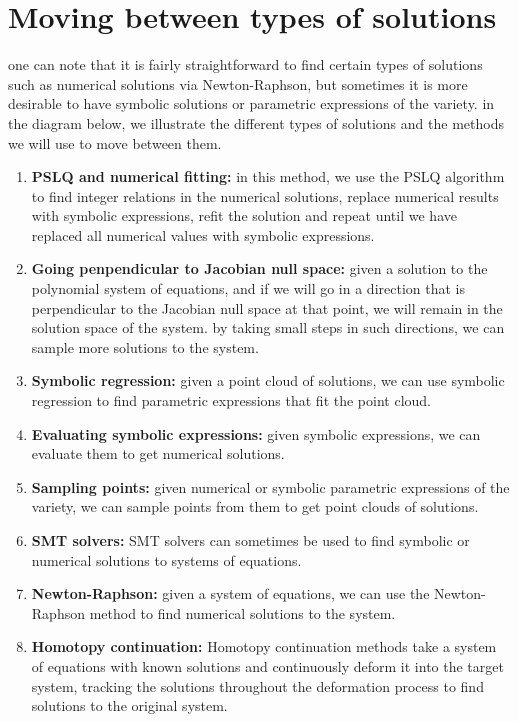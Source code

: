 \section*{Moving between types of solutions}
one can note that it is fairly straightforward to find certain types of solutions such as numerical solutions via Newton-Raphson, but sometimes it is more desirable to have symbolic solutions or parametric expressions of the variety. in the diagram below, we illustrate the different types of solutions and the methods we will use to move between them.



\begin{enumerate}
    \item \textbf{PSLQ and numerical fitting:} in this method, we use the PSLQ algorithm to find integer relations in the numerical solutions, replace numerical results with symbolic expressions, refit the solution and repeat until we have replaced all numerical values with symbolic expressions.
    \item \textbf{Going penpendicular to Jacobian null space:} given a solution to the polynomial system of equations, and if we will go in a direction that is perpendicular to the Jacobian null space at that point, we will remain in the solution space of the system. by taking small steps in such directions, we can sample more solutions to the system.
    \item \textbf{Symbolic regression:} given a point cloud of solutions, we can use symbolic regression to find parametric expressions that fit the point cloud.
    \item \textbf{Evaluating symbolic expressions:} given symbolic expressions, we can evaluate them to get numerical solutions.
    \item \textbf{Sampling points:} given numerical or symbolic parametric expressions of the variety, we can sample points from them to get point clouds of solutions.
    \item \textbf{SMT solvers:} SMT solvers can sometimes be used to find symbolic or numerical solutions to systems of equations.
    \item \textbf{Newton-Raphson:} given a system of equations, we can use the Newton-Raphson method to find numerical solutions to the system.
    \item \textbf{Homotopy continuation:} Homotopy continuation methods take a system of equations with known solutions and continuously deform it into the target system, tracking the solutions throughout the deformation process to find solutions to the original system.
\end{enumerate}
